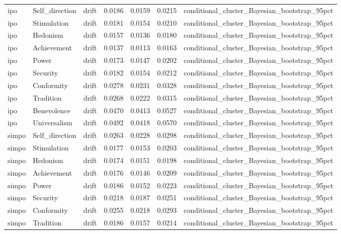 \begin{tabular}{lllrrrl}
ipo & Self\_direction & drift & 0.0186 & 0.0159 & 0.0215 & conditional\_cluster\_Bayesian\_bootstrap\_95pct \\
ipo & Stimulation & drift & 0.0181 & 0.0154 & 0.0210 & conditional\_cluster\_Bayesian\_bootstrap\_95pct \\
ipo & Hedonism & drift & 0.0157 & 0.0136 & 0.0180 & conditional\_cluster\_Bayesian\_bootstrap\_95pct \\
ipo & Achievement & drift & 0.0137 & 0.0113 & 0.0163 & conditional\_cluster\_Bayesian\_bootstrap\_95pct \\
ipo & Power & drift & 0.0173 & 0.0147 & 0.0202 & conditional\_cluster\_Bayesian\_bootstrap\_95pct \\
ipo & Security & drift & 0.0182 & 0.0154 & 0.0212 & conditional\_cluster\_Bayesian\_bootstrap\_95pct \\
ipo & Conformity & drift & 0.0278 & 0.0231 & 0.0328 & conditional\_cluster\_Bayesian\_bootstrap\_95pct \\
ipo & Tradition & drift & 0.0268 & 0.0222 & 0.0315 & conditional\_cluster\_Bayesian\_bootstrap\_95pct \\
ipo & Benevolence & drift & 0.0470 & 0.0413 & 0.0527 & conditional\_cluster\_Bayesian\_bootstrap\_95pct \\
ipo & Universalism & drift & 0.0492 & 0.0418 & 0.0570 & conditional\_cluster\_Bayesian\_bootstrap\_95pct \\
simpo & Self\_direction & drift & 0.0263 & 0.0228 & 0.0298 & conditional\_cluster\_Bayesian\_bootstrap\_95pct \\
simpo & Stimulation & drift & 0.0177 & 0.0153 & 0.0203 & conditional\_cluster\_Bayesian\_bootstrap\_95pct \\
simpo & Hedonism & drift & 0.0174 & 0.0151 & 0.0198 & conditional\_cluster\_Bayesian\_bootstrap\_95pct \\
simpo & Achievement & drift & 0.0176 & 0.0146 & 0.0209 & conditional\_cluster\_Bayesian\_bootstrap\_95pct \\
simpo & Power & drift & 0.0186 & 0.0152 & 0.0223 & conditional\_cluster\_Bayesian\_bootstrap\_95pct \\
simpo & Security & drift & 0.0218 & 0.0187 & 0.0251 & conditional\_cluster\_Bayesian\_bootstrap\_95pct \\
simpo & Conformity & drift & 0.0255 & 0.0218 & 0.0293 & conditional\_cluster\_Bayesian\_bootstrap\_95pct \\
simpo & Tradition & drift & 0.0186 & 0.0157 & 0.0214 & conditional\_cluster\_Bayesian\_bootstrap\_95pct \\

\end{tabular}
